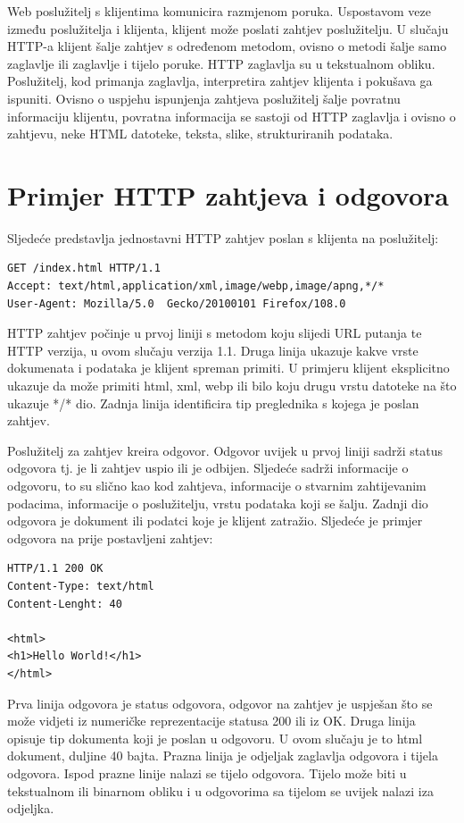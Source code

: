 \documentclass[]{foi} %
\begin{document}
Web poslužitelj s klijentima komunicira razmjenom poruka. Uspostavom veze između poslužitelja i klijenta,
klijent može poslati zahtjev poslužitelju. U slučaju HTTP-a klijent šalje zahtjev s određenom metodom,
ovisno o metodi šalje samo zaglavlje ili zaglavlje i tijelo poruke. HTTP zaglavlja su u tekstualnom obliku.
Poslužitelj, kod primanja zaglavlja, interpretira zahtjev klijenta i pokušava ga ispuniti. Ovisno o
uspjehu ispunjenja zahtjeva poslužitelj šalje povratnu informaciju klijentu, povratna informacija se sastoji
od HTTP zaglavlja i ovisno o zahtjevu, neke HTML datoteke, teksta, slike, strukturiranih podataka.

\section{Primjer HTTP zahtjeva i odgovora}

Sljedeće predstavlja jednostavni HTTP zahtjev poslan s klijenta na poslužitelj:
\begin{verbatim}
GET /index.html HTTP/1.1
Accept: text/html,application/xml,image/webp,image/apng,*/*
User-Agent: Mozilla/5.0  Gecko/20100101 Firefox/108.0
\end{verbatim}

HTTP zahtjev počinje u prvoj liniji s metodom koju slijedi URL putanja te HTTP verzija, u ovom slučaju verzija 1.1.
Druga linija ukazuje kakve vrste dokumenata i podataka je klijent spreman primiti. U primjeru klijent eksplicitno ukazuje da
može primiti html, xml, webp ili bilo koju drugu vrstu datoteke na što ukazuje */* dio.
Zadnja linija identificira tip preglednika s kojega je poslan zahtjev.

Poslužitelj za zahtjev kreira odgovor. Odgovor uvijek u prvoj liniji sadrži status odgovora tj.
je li zahtjev uspio ili je odbijen. Sljedeće sadrži informacije o odgovoru, to su slično kao
kod zahtjeva, informacije o stvarnim zahtijevanim podacima, informacije o poslužitelju,
vrstu podataka koji se šalju. Zadnji dio odgovora je dokument ili podatci koje je klijent
zatražio. Sljedeće je primjer odgovora na prije postavljeni zahtjev:
\begin{verbatim}
HTTP/1.1 200 OK
Content-Type: text/html
Content-Lenght: 40

<html>
<h1>Hello World!</h1>
</html>
\end{verbatim}
Prva linija odgovora je status odgovora, odgovor na zahtjev je uspješan što se može vidjeti iz
numeričke reprezentacije statusa 200 ili iz OK. Druga linija opisuje tip dokumenta koji je poslan
u odgovoru. U ovom slučaju je to html dokument, duljine 40 bajta. Prazna linija je odjeljak
zaglavlja odgovora i tijela odgovora. Ispod prazne linije nalazi se tijelo odgovora. Tijelo može
biti u tekstualnom ili binarnom obliku i u odgovorima sa tijelom se uvijek nalazi iza odjeljka.
\end{document}
